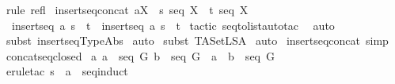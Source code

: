 \begin{isabellebody}
\isamarkupfalse%
\ {\isacharparenleft}rule\ refl{\isacharparenright}\isanewline
{}\isamarkupfalse%
%
\endisatagproof
{\isafoldproof}%
%
\isadelimproof
\isanewline
%
\endisadelimproof
\isanewline
\isanewline
\isanewline
{}\isamarkupfalse%
\ insertseq{\isacharunderscore}concat{\isacharcolon}\ {\isachardoublequoteopen}a{\isacharcolon}X\ {\isacharminus}{\isacharminus}{\isachargreater}\ s\ {\isacharcolon}seq\ X\ {\isacharminus}{\isacharminus}{\isachargreater}\ t\ {\isacharcolon}seq\ X\ {\isacharminus}{\isacharminus}{\isachargreater}\ \ \isanewline
\ \ {\isacharparenleft}insertseq\ a\ s{\isacharparenright}\ {\isacharpercent}{\isacharampersand}{\isacharcircum}\ t\ {\isacharequal}\ insertseq\ a\ {\isacharparenleft}s\ {\isacharpercent}{\isacharampersand}{\isacharcircum}\ t{\isacharparenright}{\isachardoublequoteclose}\isanewline
%
\isadelimproof
%
\endisadelimproof
%
\isatagproof
{}\isamarkupfalse%
\ {\isacharparenleft}tactic\ {\isacharverbatimopen}seq{\isacharunderscore}to{\isacharunderscore}list{\isacharunderscore}auto{\isacharunderscore}tac\ {}{\isacharverbatimclose}{\isacharparenright}\isanewline
{}\isamarkupfalse%
\ auto\isanewline
{}\isamarkupfalse%
\ {\isacharparenleft}subst\ insertseq{\isacharunderscore}TypeAbs{\isacharparenright}\isanewline
{}\isamarkupfalse%
\ auto\isanewline
{}\isamarkupfalse%
\ {\isacharparenleft}subst\ TASet{\isacharunderscore}LSA{\isacharparenright}\isanewline
{}\isamarkupfalse%
\ auto\isanewline
{}\isamarkupfalse%
%
\endisatagproof
{\isafoldproof}%
%
\isadelimproof
\isanewline
%
\endisadelimproof
{}\isamarkupfalse%
\ insertseq{\isacharunderscore}concat\ {\isacharbrackleft}simp{\isacharbrackright}\isanewline
\isanewline
\isanewline
{}\isamarkupfalse%
\ concatseq{\isacharunderscore}closed{\isacharcolon}\ \isanewline
{\isachardoublequoteopen}{\isacharbang}{\isacharbang}a{\isachardot}\ {\isacharbrackleft}{\isacharbar}a\ {\isacharcolon}\ seq\ G{\isacharsemicolon}\ b\ {\isacharcolon}\ seq\ G{\isacharbar}{\isacharbrackright}\ {\isacharequal}{\isacharequal}{\isachargreater}\ {\isacharparenleft}a\ {\isacharpercent}{\isacharampersand}{\isacharcircum}\ b{\isacharparenright}\ {\isacharcolon}\ seq\ G{\isachardoublequoteclose}\isanewline
%
\isadelimproof
%
\endisadelimproof
%
\isatagproof
{}\isamarkupfalse%
\ {\isacharparenleft}erule{\isacharunderscore}tac\ s\ {\isacharequal}\ {\isachardoublequoteopen}a{\isachardoublequoteclose}\ \ seq{\isacharunderscore}induct{\isacharparenright}\isanewline

\end{isabellebody}
